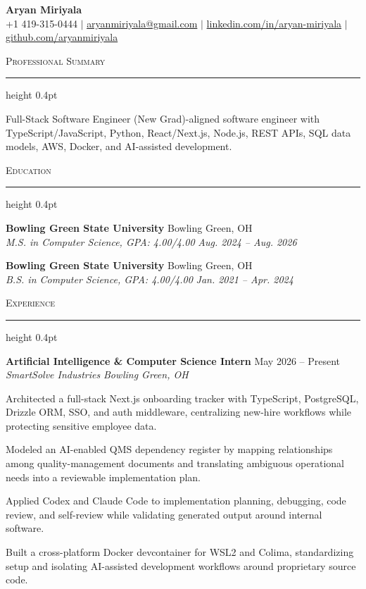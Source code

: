 \documentclass[letterpaper,11pt]{article}
\newcommand{\resumesection}[1]{%
  \par\vspace{2pt}%
  {\large\scshape #1}\par\vspace{2pt}%
  \hrule height 0.4pt\vspace{2pt}%
}
\newcommand{\resumeSubheading}[4]{
  \textbf{#1} \hfill #2\\
  \textit{#3} \hfill \textit{#4}
}
\begin{document}
\begin{center}
  {\LARGE \textbf{Aryan Miriyala}}\\[-1pt]
  \small
  +1 419-315-0444 $|$
  \href{mailto:aryanmiriyala@gmail.com}{aryanmiriyala@gmail.com} $|$
  \href{https://www.linkedin.com/in/aryan-miriyala-7788a21b6/}{linkedin.com/in/aryan-miriyala} $|$
  \href{https://github.com/aryanmiriyala}{github.com/aryanmiriyala}
\end{center}\vspace{-10pt}

\resumesection{Professional Summary}
Full-Stack Software Engineer (New Grad)-aligned software engineer with TypeScript/JavaScript, Python, React/Next.js, Node.js, REST APIs, SQL data models, AWS, Docker, and AI-assisted development.

\resumesection{Education}
\resumeSubheading
{Bowling Green State University}{Bowling Green, OH}
{M.S. in Computer Science, GPA: 4.00/4.00}{Aug. 2024 -- Aug. 2026}

\resumeSubheading
{Bowling Green State University}{Bowling Green, OH}
{B.S. in Computer Science, GPA: 4.00/4.00}{Jan. 2021 -- Apr. 2024}

\resumesection{Experience}
\resumeSubheading
{Artificial Intelligence \& Computer Science Intern}{May 2026 -- Present}
{SmartSolve Industries}{Bowling Green, OH}
\begin{tightitemize}
  \item Architected a full-stack Next.js onboarding tracker with TypeScript, PostgreSQL, Drizzle ORM, SSO, and auth middleware, centralizing new-hire workflows while protecting sensitive employee data.
  \item Modeled an AI-enabled QMS dependency register by mapping relationships among quality-management documents and translating ambiguous operational needs into a reviewable implementation plan.
  \item Applied Codex and Claude Code to implementation planning, debugging, code review, and self-review while validating generated output around internal software.
  \item Built a cross-platform Docker devcontainer for WSL2 and Colima, standardizing setup and isolating AI-assisted development workflows around proprietary source code.
\end{tightitemize}
\end{document}
